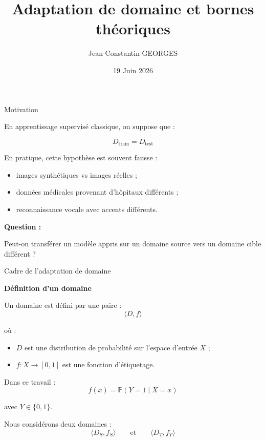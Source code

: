 \documentclass[11pt]{beamer}
\title{Adaptation de domaine et bornes théoriques}
\author{Jean Constantin GEORGES}
\institute{Université d'Angers}
\date{19 Juin 2026}
\begin{document}
\begin{frame}
    \titlepage
\end{frame}




\begin{frame}{Motivation}

En apprentissage supervisé classique, on suppose que :

\[
D_{\text{train}} = D_{\text{test}}
\]

\vspace{0.3cm}

En pratique, cette hypothèse est souvent fausse :

\begin{itemize}
    \item images synthétiques vs images réelles ;
    \item données médicales provenant d’hôpitaux différents ;
    \item reconnaissance vocale avec accents différents.
\end{itemize}

\vspace{0.3cm}

\textbf{Question :}

Peut-on transférer un modèle appris sur un domaine source vers un domaine cible différent ?

\end{frame}




\begin{frame}{Cadre de l’adaptation de domaine}

\textbf{Définition d’un domaine}

\vspace{0.3cm}

Un domaine est défini par une paire :
\[
\langle D, f \rangle
\]

où :
\begin{itemize}
    \item $D$ est une distribution de probabilité sur l’espace d’entrée $X$ ;
    
    \item $f : X \rightarrow [0,1]$ est une fonction d’étiquetage.
\end{itemize}

\vspace{0.3cm}

Dans ce travail :
\[
f(x) = \mathbb{P}(Y=1 \mid X=x)
\]

avec $Y \in \{0,1\}$.

\vspace{0.3cm}

Nous considérons deux domaines :
\[
\langle D_S, f_S \rangle
\qquad \text{et} \qquad
\langle D_T, f_T \rangle
\]

\end{frame}
\end{document}
